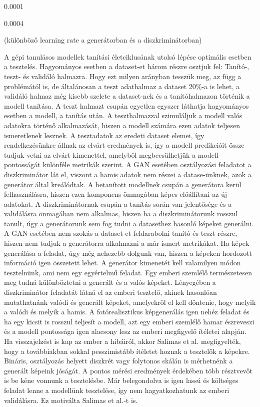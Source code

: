 0.0001

0.0004

(különböző learning rate a generátorban és a diszkriminátorban)



A gépi tanulásos modellek tanítási életciklusának utolsó lépése optimális esetben a tesztelés. Hagyományos esetben a dataset-et három részre osztjuk fel: Tanító-, teszt- és validáló halmazra. Hogy ezt milyen arányban tesszük meg, az függ a problémától is, de általánosan a teszt adathalmaz a dataset 20\%-a is lehet, a validáló halmaz még kisebb szelete a dataset-nek és a tanítóhalmazon történik a modell tanítása.
A teszt halmazt csupán egyetlen egyszer láthatja hagyományos esetben a modell, a tanítás után.
A teszthalmazzal szimuláljuk a modell valós adatokra történő alkalmazását, hiszen a modell számára ezen adatok teljesen ismeretlenek lesznek. A tesztadatok az eredeti dataset elemei, így rendelkezésünkre állnak az elvárt eredmények is, így a modell predikcióit össze tudjuk vetni az elvárt kimenettel, amelyből megbecsülhetjük a modell pontosságát különféle metrikák szerint.
A GAN esetében osztályozási feladatot a diszkriminátor lát el, viszont a hamis adatok nem részei a datase-ünknek, azok a generátor által kreálódtak. A betanított modellnek csupán a generátora kerül felhasználásra, hiszen ezen komponens önmagában képes előállítani az új adatokat. A diszkriminátornak csupán a tanítás során van jelentősége és a validálásra önmagában nem alkalmas, hiszen ha a diszkriminátorunk rosszul tanult, úgy a generátorunk sem fog tudni a datasethez hasonló képeket generálni.
A GAN esetében nem szokás a dataset-et feldarabolni tanító és teszt részre, hiszen nem tudjuk a generátorra alkalmazni a már ismert metrikákat.
Ha képek generálása a feladat, úgy még nehezebb dolgunk van, hiszen a képeken hordozott információ igen összetett lehet.
A generátor kimenetét kell valamilyen módon tesztelnünk, ami nem egy egyértelmű feladat.
Egy emberi szemlélő természetesen meg tudná különböztetni a generált és a valós képeket. Lényegében a diszkriminátor feladatát látná el az emberi tesztelő, akinek hasonlóan mutathatnánk valódi és generált képeket, amelyekről el kell döntenie, hogy melyik a valódi és melyik a hamis. A fotórealisztikus képgenerálás igen nehéz feladat és ha egy kicsit is rosszul teljesít a modell, azt egy emberi szemlélő hamar észreveszi és a modell pontossága igen alacsony lesz az emberi megfigyelő ítéletei alapján. Ha visszajelzést is kap az ember a hibáiról, akkor Salimas et al. megfigyelték, hogy a továbbiakban sokkal pesszimistább ítéletet hoznak a tesztelők a képekre. Bináris, osztályozás helyett diszkrét vagy folytonos skálán is mérhetnénk a generált képeink jóságát. A pontos mérési eredmények érdekében több résztvevőt is be kéne vonnunk a tesztelésbe. Már belegondolva is igen lassú és költséges feladat lenne a modellünk tesztelése, így nem hagyatkozhatunk az emberi validálásra. Ez motiválta Salimas et al.-t is.

